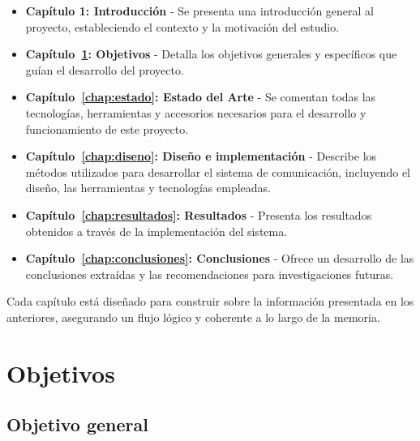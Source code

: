 \documentclass[a4paper, 12pt]{book}
\begin{document}
\begin{itemize}
  \item \textbf{Capítulo 1: Introducción} - Se presenta una introducción general al proyecto, estableciendo el contexto y 
  la motivación del estudio.
  
  \item \textbf{Capítulo~\ref{chap:objetivos}: Objetivos} - Detalla los objetivos generales y específicos que guían el desarrollo del proyecto.
  
  \item \textbf{Capítulo~\ref{chap:estado}: Estado del Arte} - Se comentan todas las tecnologías, herramientas y accesorios necesarios
 para el desarrollo y funcionamiento de este proyecto.
  
  \item \textbf{Capítulo~\ref{chap:diseno}: Diseño e implementación} - Describe los métodos utilizados para desarrollar el sistema de comunicación, 
  incluyendo el diseño, las herramientas y tecnologías empleadas.
  
  \item \textbf{Capítulo~\ref{chap:resultados}: Resultados} - Presenta los resultados obtenidos a través de la implementación del sistema.
  
  \item \textbf{Capítulo~\ref{chap:conclusiones}: Conclusiones} - Ofrece un desarrollo de las conclusiones extraídas y 
  las recomendaciones para investigaciones futuras.
\end{itemize}

Cada capítulo está diseñado para construir sobre la información presentada en los anteriores, asegurando un 
flujo lógico y coherente a lo largo de la memoria.





\cleardoublepage %
\chapter{Objetivos} %
\label{chap:objetivos} %

\section{Objetivo general} %
\label{sec:objetivo-general} %
\end{document}
